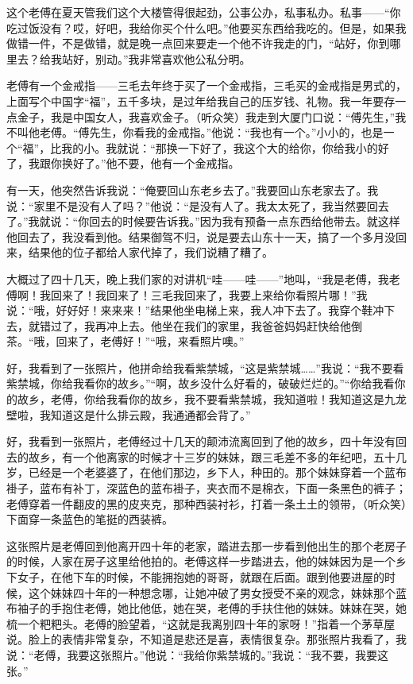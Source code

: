 \par 这个老傅在夏天管我们这个大楼管得很起劲，公事公办，私事私办。私事——“你吃过饭没有？哎，好吧，我给你买个什么吧。”他要买东西给我吃的。但是，如果我做错一件，不是做错，就是晚一点回来要走一个他不许我走的门，“站好，你到哪里去？给我站好，别动。”我非常喜欢他公私分明。
\par 老傅有一个金戒指——三毛去年终于买了一个金戒指，三毛买的金戒指是男式的，上面写个中国字“福”，五千多块，是过年给我自己的压岁钱、礼物。我一年要存一点金子，我是中国女人，我喜欢金子。（听众笑）我走到大厦门口说：“傅先生，”我不叫他老傅。“傅先生，你看我的金戒指。”他说：“我也有一个。”小小的，也是一个“福”，比我的小。我就说：“那换一下好了，我这个大的给你，你给我小的好了，我跟你换好了。”他不要，他有一个金戒指。
\par 有一天，他突然告诉我说：“俺要回山东老乡去了。”我要回山东老家去了。我说：“家里不是没有人了吗？”他说：“是没有人了。我太太死了，我当然要回去了。”我就说：“你回去的时候要告诉我。”因为我有预备一点东西给他带去。就这样他回去了，我没看到他。结果御驾不归，说是要去山东十一天，搞了一个多月没回来，结果他的位子都给人家代掉了，我们说糟了糟了。
\par 大概过了四十几天，晚上我们家的对讲机“哇——哇——”地叫，“我是老傅，我老傅啊！我回来了！我回来了！三毛我回来了，我要上来给你看照片哪！”我说：“哦，好好好！来来来！”结果他坐电梯上来，我人冲下去了。我穿个鞋冲下去，就错过了，我再冲上去。他坐在我们的家里，我爸爸妈妈赶快给他倒茶。“哦，回来了，老傅好！”“哦，来看照片噢。”
\par 好，我看到了一张照片，他拼命给我看紫禁城，“这是紫禁城……”我说：“我不要看紫禁城，你给我看你的故乡。”“啊，故乡没什么好看的，破破烂烂的。”“你给我看你的故乡，老傅，你给我看你的故乡，我不要看紫禁城，我知道啦！我知道这是九龙壁啦，我知道这是什么排云殿，我通通都会背了。”
\par 好，我看到一张照片，老傅经过十几天的颠沛流离回到了他的故乡，四十年没有回去的故乡，有一个他离家的时候才十三岁的妹妹，跟三毛差不多的年纪吧，五十几岁，已经是一个老婆婆了，在他们那边，乡下人，种田的。那个妹妹穿着一个蓝布褂子，蓝布有补丁，深蓝色的蓝布褂子，夹衣而不是棉衣，下面一条黑色的裤子；老傅穿着一件翻皮的黑的皮夹克，那种西装衬衫，打着一条土土的领带，（听众笑）下面穿一条蓝色的笔挺的西装裤。
\par 这张照片是老傅回到他离开四十年的老家，踏进去那一步看到他出生的那个老房子的时候，人家在房子这里给他拍的。老傅这样一步踏进去，他的妹妹因为是一个乡下女子，在他下车的时候，不能拥抱她的哥哥，就跟在后面。跟到他要进屋的时候，这个妹妹四十年的一种想念哪，让她冲破了男女授受不亲的观念，妹妹那个蓝布袖子的手抱住老傅，她比他低，她在哭，老傅的手扶住他的妹妹。妹妹在哭，她梳一个粑粑头。老傅的脸望着，“这就是我离别四十年的家呀！”指着一个茅草屋说。脸上的表情非常复杂，不知道是悲还是喜，表情很复杂。那张照片我看了，我说：“老傅，我要这张照片。”他说：“我给你紫禁城的。”我说：“我不要，我要这张。”
